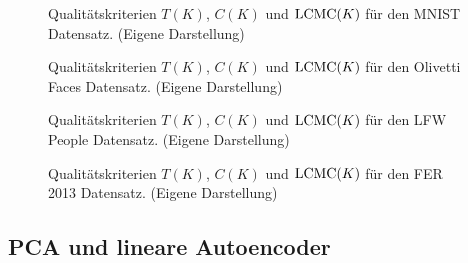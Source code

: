 \begin{figure}[ht]
	\label{fig:MNISTMetrics}
	\begin{center}
		
	\end{center}
	\caption[Qualitätskriterien]{Qualitätskriterien $T(K)$, $C(K)$ und $\operatorname{LCMC}(K)$ für den MNIST Datensatz. (Eigene Darstellung)}
\end{figure}

\begin{figure}[ht]
	\label{fig:OlivettiFacesMetrics}
	\begin{center}
		
	\end{center}
	\caption[Qualitätskriterien]{Qualitätskriterien $T(K)$, $C(K)$ und $\operatorname{LCMC}(K)$ für den Olivetti Faces Datensatz. (Eigene Darstellung)}
\end{figure}

\begin{figure}[ht]
	\label{fig:LfwPeopleMetrics}
	\begin{center}
		
	\end{center}
	\caption[Qualitätskriterien]{Qualitätskriterien $T(K)$, $C(K)$ und $\operatorname{LCMC}(K)$ für den LFW People Datensatz. (Eigene Darstellung)}
\end{figure}

\begin{figure}[ht]
	\label{fig:FER2013Metrics}
	\begin{center}
		
	\end{center}
	\caption[Qualitätskriterien]{Qualitätskriterien $T(K)$, $C(K)$ und $\operatorname{LCMC}(K)$ für den FER 2013 Datensatz. (Eigene Darstellung)}
\end{figure}

\subsection{PCA und lineare Autoencoder}
\label{ch:Vergleich:sec:Resultate:PCA_linearAE}